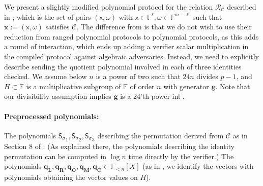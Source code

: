 \documentclass[11pt]{article} %
\newcommand{\F}{\ensuremath{\mathbb F}\xspace}
\newcommand{\defeq}{:=}
\newcommand{\inp}{\ensuremath{\mathsf{x}}\xspace}
\newcommand{\wit}{\ensuremath{\omega}\xspace}
\newcommand{\rel}{\ensuremath{\mathcal{R}}\xspace}
\newcommand{\hgen}{\ensuremath{\mathbf{g}}\xspace}
\newcommand{\polysofdeg}[1]{\ensuremath{\F_{< #1}[X]}\xspace}
\newcommand{\sigpoly}{\ensuremath{\mathsf{S_{\sigma}}}\xspace}
\newcommand{\selleft}{\ensuremath{\mathbf{q_L}}\xspace}
\newcommand{\selright}{\ensuremath{\mathbf{q_R}}\xspace}
\newcommand{\selout}{\ensuremath{\mathbf{q_O}}\xspace}
\newcommand{\selmult}{\ensuremath{\mathbf{q_M}}\xspace}
\newcommand{\selconst}{\ensuremath{\mathbf{q_C}}\xspace}
\newcommand{\assignment}{\ensuremath{\mathbf{x}}\xspace}
\newcommand{\constsystem}{\ensuremath{\mathscr{C}}\xspace}
\newcommand{\relof}[1]{\ensuremath{\rel_{#1}}\xspace}
\newcommand{\prg}[1]{ \paragraph{\textbf{#1}}}
\begin{document}
We present a slightly modified polynomial protocol for the relation 
\relof{\constsystem} described in \cite{plonk}; which is the set of pairs $(\inp,\wit)$ with $\inp\in \F^\ell,\wit\in \F^{m-\ell}$ such 
that $\assignment\defeq (\inp,\wit)$ satisfies \constsystem. 
The difference from \cite{plonk} is that we do not wish to use their reduction from ranged polynomial protocols to polynomial protocols, as
this adds a round of interaction, which ends up adding a verifier scalar multiplication in the compiled protocol against algebraic adversaries.
Instead, we need to explicitly describe sending the quotient polynomial involved in each of three identities checked.
We assume below $n$ is a power of two such that $24n$ divides $p-1$, and $H\subset \F$ is a multiplicative subgroup of \F of order $n$ with generator $\hgen$.
Note that our divisibility assumption implies \hgen is a $24$'th power in\F.


\prg{Preprocessed polynomials:}


The polynomials $\sigpoly_1,\sigpoly_2,\sigpoly_3$ describing the permutation derived from \constsystem as in Section 8 of \cite{plonk}.
(As explained there, the polynomials describing the identity permutation can be computed in $\log n$ time directly by the verifier.)
The polynomials $\selleft,\selright,\selout,\selmult,\selconst\in \polysofdeg{n}$ (as in \cite{plonk}, we identify the vectors with polynomials obtaining the vector values on $H$).
\end{document}
